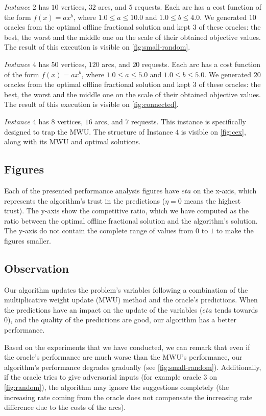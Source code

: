 \textit{Instance $2$} has $10$ vertices, $32$ arcs, and $5$ requests. Each arc has a cost function of the form $f(x) = a x^b$, where $1.0 \le a \le 10.0$ and $1.0 \le b \le 4.0$. We generated $10$ oracles from the optimal offline fractional solution and kept $3$ of these oracles: the best, the worst and the middle one on the scale of their obtained objective values. The result of this execution is visible on \cref{fig:small-random}.

\textit{Instance $4$} has $50$ vertices, $120$ arcs, and $20$ requests. Each arc has a cost function of the form $f(x) = a x^b$, where $1.0 \le a \le 5.0$ and $1.0 \le b \le 5.0$. We generated $20$ oracles from the optimal offline fractional solution and kept $3$ of these oracles: the best, the worst and the middle one on the scale of their obtained objective values. The result of this execution is visible on \cref{fig:connected}.

\textit{Instance $4$} has $8$ vertices, $16$ arcs, and $7$ requests. This instance is specifically designed to trap the MWU. The structure of Instance $4$ is visible on \cref{fig:cex}, along with its MWU and optimal solutions.


\subsection{Figures} Each of the presented performance analysis figures have $eta$ on the x-axis, which represents the algorithm's trust in the predictions ($\eta = 0$ means the highest trust). The y-axis show the competitive ratio, which we have computed as the ratio between the optimal offline fractional solution and the algorithm's solution. The y-axis do not contain the complete range of values from $0$ to $1$ to make the figures smaller.

\subsection{Observation} Our algorithm updates the problem's variables following a combination of the multiplicative weight update (MWU) method and the oracle's predictions. When the predictions have an impact on the update of the variables ($eta$ tends towards $0$), and the quality of the predictions are good, our algorithm has a better performance.

Based on the experiments that we have conducted, we can remark that even if the oracle's performance are much worse than the MWU's performance, our algorithm's performance degrades gradually (see \cref{fig:small-random}). Additionally, if the oracle tries to give adversarial inputs (for example oracle $3$ on \cref{fig:random}), the algorithm may ignore the suggestions completely (the increasing rate coming from the oracle does not compensate the increasing rate difference due to the costs of the arcs).

